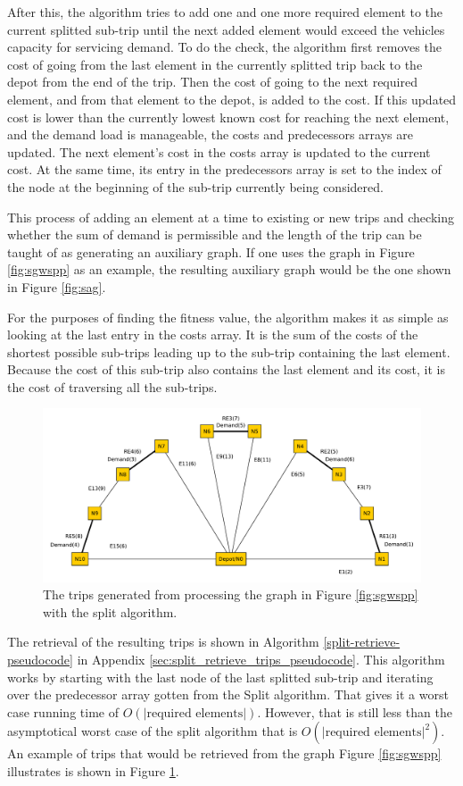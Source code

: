 After this, the algorithm tries to add one and one more required element to the current splitted sub-trip until the next added element would exceed the vehicles capacity for servicing demand. To do the check, the algorithm first removes the cost of going from the last element in the currently splitted trip back to the depot from the end of the trip. Then the cost of going to the next required element, and from that element to the depot, is added to the cost. If this updated cost is lower than the currently lowest known cost for reaching the next element, and the demand load is manageable, the costs and predecessors arrays are updated. The next element's cost in the costs array is updated to the current cost. At the same time, its entry in the predecessors array is set to the index of the node at the beginning of the sub-trip currently being considered.

This process of adding an element at a time to existing or new trips and checking whether the sum of demand is permissible and the length of the trip can be taught of as generating an auxiliary graph. If one uses the graph in Figure \ref{fig:sgwspp} as an example, the resulting auxiliary graph would be the one shown in Figure \ref{fig:sag}.

For the purposes of finding the fitness value, the algorithm makes it as simple as looking at the last entry in the costs array. It is the sum of the costs of the shortest possible sub-trips leading up to the sub-trip containing the last element. Because the cost of this sub-trip also contains the last element and its cost, it is the cost of traversing all the sub-trips.

\begin{figure}[thbp]
    \centerline{\includegraphics[width=\textwidth]{figures/SplitIllustrations/Split_GraphWithRoutes.pdf}}
    \caption{The trips generated from processing the graph in Figure \ref{fig:sgwspp} with the split algorithm.}
    \label{fig:sgwr}
\end{figure}

The retrieval of the resulting trips is shown in Algorithm \ref{split-retrieve-pseudocode} in Appendix \ref{sec:split_retrieve_trips_pseudocode}. This algorithm works by starting with the last node of the last splitted sub-trip and iterating over the predecessor array gotten from the Split algorithm. That gives it a worst case running time of $O(|\text{required elements}|)$. However, that is still less than the asymptotical worst case of the split algorithm that is $O(|\text{required elements}|^2)$. An example of trips that would be retrieved from the graph Figure \ref{fig:sgwspp} illustrates is shown in Figure \ref{fig:sgwr}.

\cleardoublepage

